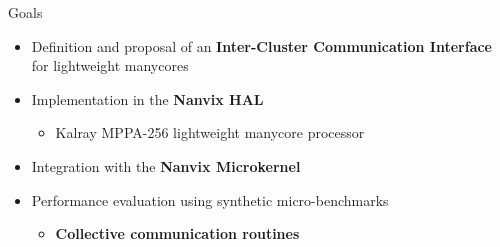 	\begin{frame}[fragile]{Goals}
		\begin{itemize}
			\item Definition and proposal of an \textbf{Inter-Cluster Communication Interface} for lightweight manycores
		\end{itemize}

		\begin{itemize}
			\item Implementation in the \textbf{Nanvix HAL}
			\begin{itemize}
				\item Kalray MPPA-256 lightweight manycore processor
			\end{itemize}
		\end{itemize}

		\begin{itemize}
			\item Integration with the \textbf{Nanvix Microkernel}
		\end{itemize}

		\begin{itemize}
			\item Performance evaluation using synthetic micro-benchmarks
			\begin{itemize}
				\item \textbf{Collective communication routines}
			\end{itemize}
		\end{itemize}

	\end{frame}

